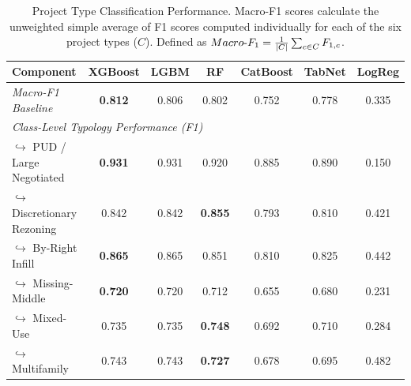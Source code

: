 \begin{table}[H]
\centering
\caption[Project Type and Scale]{Project Type Classification Performance. Macro-F1 scores calculate the unweighted simple average of F1 scores computed individually for each of the six project types ($C$). Defined as $Macro\textnormal{-}F_1 = \frac{1}{|C|} \sum_{c \in C} F_{1,c}$.}
\label{tab:stage_b}
\begin{tabular}{lcccccc}
\toprule
\textbf{Component} & \textbf{XGBoost} & \textbf{LGBM} & \textbf{RF} & \textbf{CatBoost} & \textbf{TabNet} & \textbf{LogReg} \\
\midrule
\textit{Macro-F1 Baseline} & \textbf{0.812} & 0.806 & 0.802 & 0.752 & 0.778 & 0.335 \\
\midrule
\multicolumn{7}{l}{\textit{Class-Level Typology Performance (F1)}} \\
$\hookrightarrow$ PUD / Large Negotiated & \textbf{0.931} & 0.931 & 0.920 & 0.885 & 0.890 & 0.150 \\
$\hookrightarrow$ Discretionary Rezoning & 0.842 & 0.842 & \textbf{0.855} & 0.793 & 0.810 & 0.421 \\
$\hookrightarrow$ By-Right Infill & \textbf{0.865} & 0.865 & 0.851 & 0.810 & 0.825 & 0.442 \\
$\hookrightarrow$ Missing-Middle & \textbf{0.720} & 0.720 & 0.712 & 0.655 & 0.680 & 0.231 \\
$\hookrightarrow$ Mixed-Use & 0.735 & 0.735 & \textbf{0.748} & 0.692 & 0.710 & 0.284 \\
$\hookrightarrow$ Multifamily & 0.743 & 0.743 & \textbf{0.727} & 0.678 & 0.695 & 0.482 \\
\bottomrule
\end{tabular}
\end{table}
